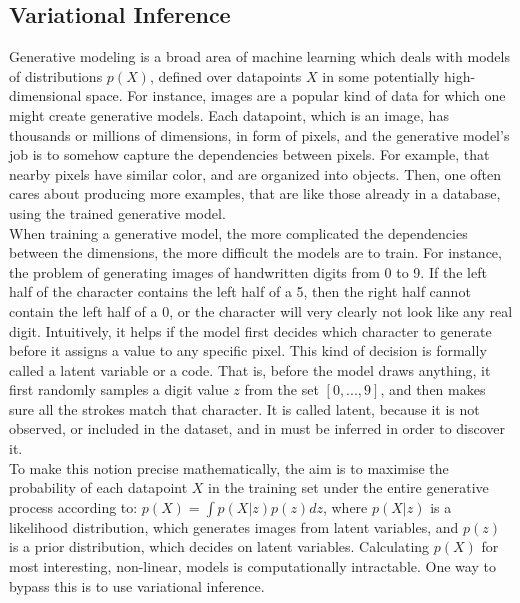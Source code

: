\subsection{Variational Inference}

Generative modeling is a broad area of machine learning which deals with models of distributions $p(X)$, defined over datapoints $X$ in some potentially high-dimensional space. For instance, images are a popular kind of data for which one might create generative models. Each datapoint, which is an image, has thousands or millions of dimensions, in form of pixels, and the generative model’s job is to somehow capture the dependencies between pixels. For example, that nearby pixels have similar color, and are organized into objects. Then, one often cares about producing more examples, that are like those already in a database, using the trained generative model. \\
When training a generative model, the more complicated the dependencies between the dimensions, the more difficult the models are to train. For instance, the problem of generating images of handwritten digits from 0 to 9. If the left half of the character contains the left half of a 5, then the right half cannot contain the left half of a 0, or the character will very clearly not look like any real digit. Intuitively, it helps if the model first decides which character to generate before it assigns a value to any specific pixel. This kind of decision is formally called a latent variable or a code. That is, before the model draws anything, it first randomly samples a digit value $z$ from the set $[0, ..., 9]$, and then makes sure all the strokes match that character. It is called latent, because it is not observed, or included in the dataset, and in must be inferred in order to discover it.\\
To make this notion precise mathematically, the aim is to maximise the probability of each datapoint $X$ in the training set under the entire generative process according to: $p(X) = \int p(X|z)p(z)dz$, where $p(X|z)$ is a likelihood distribution, which generates images from latent variables, and $p(z)$ is a prior distribution, which decides on latent variables. Calculating $p(X)$ for most interesting, non-linear, models is computationally intractable. One way to bypass this is to use variational inference.

